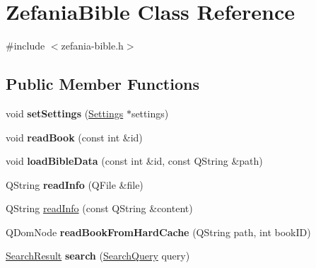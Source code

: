 \hypertarget{classZefaniaBible}{
\section{ZefaniaBible Class Reference}
\label{classZefaniaBible}
}


{\ttfamily \#include $<$zefania-\/bible.h$>$}\subsection*{Public Member Functions}
\begin{DoxyCompactItemize}
\item 
\hypertarget{classZefaniaBible_a1903feb3c9d802fec5cabb90aaeeedf4}{
void {\bfseries setSettings} (\hyperlink{classSettings}{Settings} $\ast$settings)}
\label{classZefaniaBible_a1903feb3c9d802fec5cabb90aaeeedf4}

\item 
\hypertarget{classZefaniaBible_a35afefc88d8403c025125b8bf7e325f3}{
void {\bfseries readBook} (const int \&id)}
\label{classZefaniaBible_a35afefc88d8403c025125b8bf7e325f3}

\item 
\hypertarget{classZefaniaBible_aef886a2ed5d65079d2625cacfc68130c}{
void {\bfseries loadBibleData} (const int \&id, const QString \&path)}
\label{classZefaniaBible_aef886a2ed5d65079d2625cacfc68130c}

\item 
\hypertarget{classZefaniaBible_a530b3de742b09436a6698140c428a51a}{
QString {\bfseries readInfo} (QFile \&file)}
\label{classZefaniaBible_a530b3de742b09436a6698140c428a51a}

\item 
QString \hyperlink{classZefaniaBible_a2295f264abb8c603d6160d004327f9b9}{readInfo} (const QString \&content)
\item 
\hypertarget{classZefaniaBible_ad6aa8172ba4fc50114314c1f91a28204}{
QDomNode {\bfseries readBookFromHardCache} (QString path, int bookID)}
\label{classZefaniaBible_ad6aa8172ba4fc50114314c1f91a28204}

\item 
\hypertarget{classZefaniaBible_a31e7ab30e35e4c59e7a0e74acbb30951}{
\hyperlink{classSearchResult}{SearchResult} {\bfseries search} (\hyperlink{classSearchQuery}{SearchQuery} query)}
\label{classZefaniaBible_a31e7ab30e35e4c59e7a0e74acbb30951}


\end{DoxyCompactItemize}
